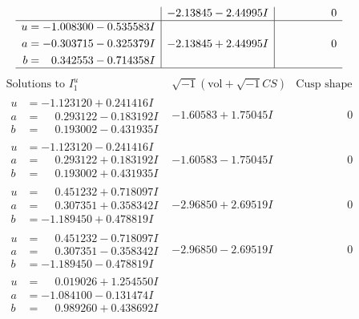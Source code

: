 \documentclass[1p]{elsarticle_modified}
\theoremstyle{definition}
\newcommand{\I}{\sqrt{-1}}
\begin{document}
$$\begin{array}{c|c|c}
 & -2.13845 - 2.44995 I & \phantom{-0.000000 } 0 \\ \hline\begin{aligned}
u &= -1.008300 - 0.535583 I \\
a &= -0.303715 - 0.325379 I \\
b &= \phantom{-}0.342553 - 0.714358 I\end{aligned}
 & -2.13845 + 2.44995 I & \phantom{-0.000000 } 0\\
 \hline 
 \end{array}$$\newpage$$\begin{array}{c|c|c}  
\text{Solutions to }I^u_{1}& \I (\text{vol} + \sqrt{-1}CS) & \text{Cusp shape}\\
 \hline 
\begin{aligned}
u &= -1.123120 + 0.241416 I \\
a &= \phantom{-}0.293122 - 0.183192 I \\
b &= \phantom{-}0.193002 - 0.431935 I\end{aligned}
 & -1.60583 + 1.75045 I & \phantom{-0.000000 } 0 \\ \hline\begin{aligned}
u &= -1.123120 - 0.241416 I \\
a &= \phantom{-}0.293122 + 0.183192 I \\
b &= \phantom{-}0.193002 + 0.431935 I\end{aligned}
 & -1.60583 - 1.75045 I & \phantom{-0.000000 } 0 \\ \hline\begin{aligned}
u &= \phantom{-}0.451232 + 0.718097 I \\
a &= \phantom{-}0.307351 + 0.358342 I \\
b &= -1.189450 + 0.478819 I\end{aligned}
 & -2.96850 + 2.69519 I & \phantom{-0.000000 } 0 \\ \hline\begin{aligned}
u &= \phantom{-}0.451232 - 0.718097 I \\
a &= \phantom{-}0.307351 - 0.358342 I \\
b &= -1.189450 - 0.478819 I\end{aligned}
 & -2.96850 - 2.69519 I & \phantom{-0.000000 } 0 \\ \hline\begin{aligned}
u &= \phantom{-}0.019026 + 1.254550 I \\
a &= -1.084100 - 0.131474 I \\
b &= \phantom{-}0.989260 + 0.438692 I\end{aligned}

\end{array}$$
\end{document}

